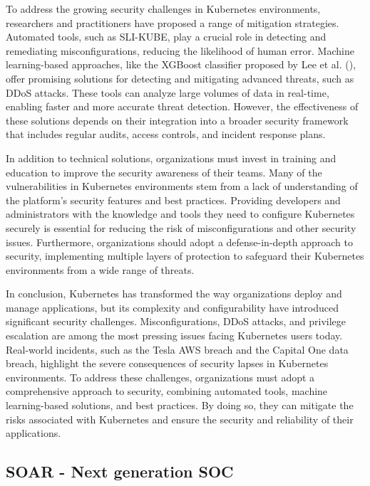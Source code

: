 To address the growing security challenges in Kubernetes environments, researchers and practitioners have proposed a range of mitigation strategies. Automated tools, such as SLI-KUBE, play a crucial role in detecting and remediating misconfigurations, reducing the likelihood of human error. Machine learning-based approaches, like the XGBoost classifier proposed by Lee et al. (\citeyear{lee2023}), offer promising solutions for detecting and mitigating advanced threats, such as DDoS attacks. These tools can analyze large volumes of data in real-time, enabling faster and more accurate threat detection. However, the effectiveness of these solutions depends on their integration into a broader security framework that includes regular audits, access controls, and incident response plans.

In addition to technical solutions, organizations must invest in training and education to improve the security awareness of their teams. Many of the vulnerabilities in Kubernetes environments stem from a lack of understanding of the platform's security features and best practices. Providing developers and administrators with the knowledge and tools they need to configure Kubernetes securely is essential for reducing the risk of misconfigurations and other security issues. Furthermore, organizations should adopt a defense-in-depth approach to security, implementing multiple layers of protection to safeguard their Kubernetes environments from a wide range of threats.

In conclusion, Kubernetes has transformed the way organizations deploy and manage applications, but its complexity and configurability have introduced significant security challenges. Misconfigurations, DDoS attacks, and privilege escalation are among the most pressing issues facing Kubernetes users today. Real-world incidents, such as the Tesla AWS breach and the Capital One data breach, highlight the severe consequences of security lapses in Kubernetes environments. To address these challenges, organizations must adopt a comprehensive approach to security, combining automated tools, machine learning-based solutions, and best practices. By doing so, they can mitigate the risks associated with Kubernetes and ensure the security and reliability of their applications.

\subsection{SOAR - Next generation SOC}

